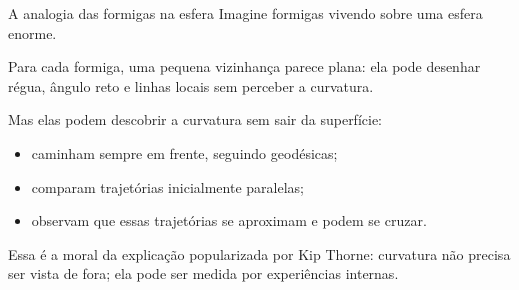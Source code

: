 \documentclass[aspectratio=169,10pt]{beamer}
\begin{document}
\begin{frame}{A analogia das formigas na esfera}
  Imagine formigas vivendo sobre uma esfera enorme.

  \vspace{0.25cm}
  Para cada formiga, uma pequena vizinhança parece plana: ela pode desenhar régua, ângulo reto e linhas locais sem perceber a curvatura.

  \vspace{0.25cm}
  Mas elas podem descobrir a curvatura sem sair da superfície:
  \begin{itemize}
    \item caminham sempre em frente, seguindo geodésicas;
    \item comparam trajetórias inicialmente paralelas;
    \item observam que essas trajetórias se aproximam e podem se cruzar.
  \end{itemize}

  \vspace{0.25cm}
  Essa é a moral da explicação popularizada por Kip Thorne: curvatura não precisa ser vista de fora; ela pode ser medida por experiências internas.
\end{frame}
\end{document}
